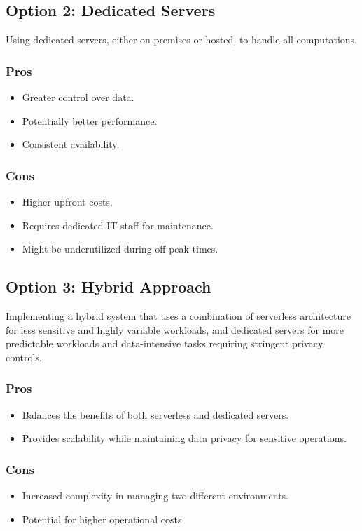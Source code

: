 \subsection*{Option 2: Dedicated Servers}
Using dedicated servers, either on-premises or hosted, to handle all computations.
\subsubsection*{Pros}
\begin{itemize}
    \item Greater control over data.
    \item Potentially better performance.
    \item Consistent availability.
\end{itemize}
\subsubsection*{Cons}
\begin{itemize}
    \item Higher upfront costs.
    \item Requires dedicated IT staff for maintenance.
    \item Might be underutilized during off-peak times.
\end{itemize}

\subsection*{Option 3: Hybrid Approach}
Implementing a hybrid system that uses a combination of serverless architecture for less sensitive and highly variable workloads, and dedicated servers for more predictable workloads and data-intensive tasks requiring stringent privacy controls.
\subsubsection*{Pros}
\begin{itemize}
    \item Balances the benefits of both serverless and dedicated servers.
    \item Provides scalability while maintaining data privacy for sensitive operations.
\end{itemize}
\subsubsection*{Cons}
\begin{itemize}
    \item Increased complexity in managing two different environments.
    \item Potential for higher operational costs.
\end{itemize}

